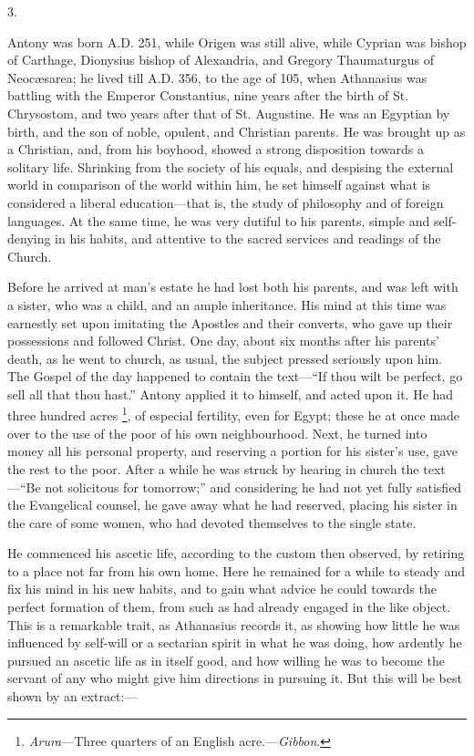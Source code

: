 3.

Antony was born A.D. 251, while Origen was
still alive, while Cyprian was bishop of Carthage, Dionysius bishop of
Alexandria, and Gregory Thaumaturgus of Neocæsarea; he lived till A.D.
356, to the age of 105, when Athanasius was battling with the Emperor
Constantius, nine years after the birth of St. Chrysostom, and two
years after that of St. Augustine. He was an Egyptian by birth, and
the son of noble, opulent, and Christian parents. He was brought up as
a Christian, and, from his boyhood, showed a strong disposition
towards a solitary life. Shrinking from the society of his equals, and
despising the external world in comparison of the world within him, he
set himself against what is considered a liberal education—that is,
the study of philosophy and of foreign languages. At the same time, he
was very dutiful to his parents, simple and self-denying in his
habits, and attentive to the sacred services and readings of the
Church.

Before he arrived at man's estate he had lost both his parents, and
was left with a sister, who was a child, and an ample inheritance. His
mind at this time was earnestly set upon imitating the Apostles and
their converts, who gave up their possessions and followed Christ. One
day, about six months after his parents' death, as he went to church,
as usual, the subject pressed seriously upon him. The Gospel of the
day happened to contain the text—``If thou wilt be
perfect, go sell all that thou hast.'' Antony applied it to
himself, and acted upon it. He had three hundred acres \footnote{\emph{Arura}—Three quarters of an English acre.—\emph{Gibbon}.},
of especial fertility, even for Egypt; these he at once made over to
the use of the poor of his own neighbourhood. Next, he turned into
money all his personal property, and reserving a portion for his
sister's use, gave the rest to the poor. After a while he was struck
by hearing in church the text—``Be not solicitous for
tomorrow;'' and considering he had not yet fully satisfied the
Evangelical counsel, he gave away what he had reserved, placing his
sister in the care of some women, who had devoted themselves to the
single state.

He commenced his ascetic life, according to the custom then
observed, by retiring to a place not far from his own home. Here he
remained for a while to steady and fix his mind in his new habits, and
to gain what advice he could towards the perfect formation of them,
from such as had already engaged in the like object. This is a
remarkable trait, as Athanasius records it, as showing how little he
was influenced by self-will or a sectarian spirit in what he was
doing, how ardently he pursued an ascetic life as in itself good, and
how willing he was to become the servant of any who might give him
directions in pursuing it. But this will be best shown by an extract:—

